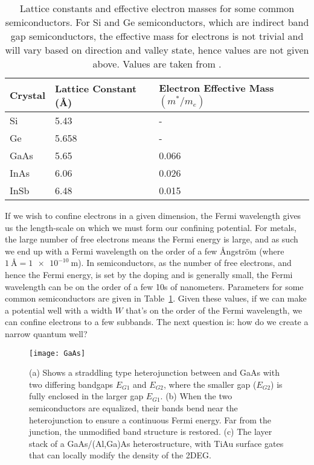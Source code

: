 \begin{table}
  \centering
  \begin{tabular}{|l|l|l|}
   \hline
   Crystal & Lattice Constant (\si{\angstrom}) & Electron Effective Mass$(m^*/m_e)$ \\
   \hline
   Si & 5.43 & - \\
   Ge & 5.658 & - \\
   GaAs & 5.65 & 0.066 \\
   InAs & 6.06 & 0.026 \\
   InSb & 6.48 & 0.015 \\
   \hline
  \end{tabular}
  \caption[Properties of some common Semiconductors]
  {Lattice constants and effective electron masses for some common semiconductors. For Si and Ge semiconductors, which are
  indirect band gap semiconductors, the effective mass for electrons is not trivial and will vary based
  on direction and valley state, hence values are not given above. Values are taken from \cite{Kittel2004,InSbParam}.}
  \label{tab:semiprop}
\end{table}

If we wish to confine electrons in a given dimension, the Fermi wavelength gives us the length-scale on which we must form
our confining potential. For metals, the large number of free electrons means the Fermi energy is large, and as such we end up with a
Fermi wavelength on the order of a few Ångström (where $\SI{1}{\angstrom} = \SI{1e-10}{\meter}$). In semiconductors, as
the number of free electrons, and hence the Fermi energy, is set by the doping and is generally small, the Fermi
wavelength can be on the order of a few 10s of nanometers. Parameters for some common semiconductors are given
in Table~\ref{tab:semiprop}. Given these values, if we can make a potential well with a width $W$ that's on
the order of the Fermi wavelength, we can confine electrons to a few subbands. The next question is: how
do we create a narrow quantum well?

\begin{figure}
  \texttt{[image: GaAs]}
  \caption[Band bending in a straddling type heterojunction, and the GaAs/AlGaAs heterostructure]
  {\label{fig:heterostructure}(a) Shows a straddling type heterojunction between  and GaAs with two
  differing bandgaps $E_{G1}$ and $E_{G2}$, where the smaller gap ($E_{G2}$) is fully enclosed in the larger gap $E_{G1}$.
  (b) When the two semiconductors are equalized, their bands bend near the heterojunction to ensure a continuous Fermi energy.
  Far from the junction, the unmodified band structure is restored. (c) The layer stack of a GaAs/(Al,Ga)As heterostructure,
  with TiAu surface gates that can locally modify the density of the 2DEG.}
\end{figure}

